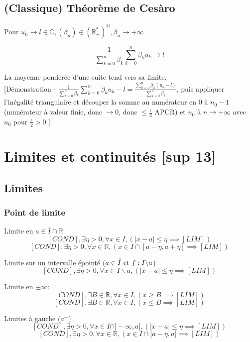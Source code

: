 \documentclass[openany]{book}
\begin{document}
\subsection{(Classique) Théorème de Cesàro}
Pour $ u_n \longrightarrow l \in \mathbb{C} , (\beta_n) \in (\mathbb{R}_+^*)^{\mathbb{N}} , \beta_n \longrightarrow +\infty $

\[ \frac{1}{\sum_{k=0}^{n} \beta_k} \sum_{k=0}^{n} \beta_k u_k \longrightarrow l \]

\noindent La moyenne pondérée d'une suite tend vers sa limite. \\

[Démonstration - $\frac{1}{\sum_{k=0}^{n} \beta_k} \sum_{k=0}^{n} \beta_k u_k - l = \frac{\sum_{k=0}^{n} \beta_k (u_k - l)}{\sum_{k=0}^{n} \beta_k}$, puis appliquer l'inégalité triangulaire et découper la somme au numérateur en $ 0 $ à $ n_0 - 1 $ (numérateur à valeur finie, donc $\longrightarrow 0$, donc $\leq \frac{\epsilon}{2}$ APCR) et $ n_0 $ à $ n \longrightarrow +\infty $ avec $n_0$ pour $\frac{\epsilon}{2} > 0$ ]

\clearpage

\section{Limites et continuités [sup 13]}
\subsection{Limites}
\subsubsection{Point de limite}
Limite en $a \in \overline{I}\cap\mathbb{R}$:
\[ [COND], \exists \eta > 0, \forall x \in I, (| x - a | \leq \eta \implies [LIM]) \]
\[ [COND], \exists \eta > 0, \forall x \in \mathbb{R}, (x \in I \cap [a-\eta, a+\eta] \implies [LIM]) \]

\noindent Limite sur un intervalle épointé ($a \in \mathring{I} \text{ et } f : I\backslash {a} $)
\[ [COND], \exists \eta > 0, \forall x \in I\backslash {a}, (| x - a | \leq \eta \implies [LIM]) \]

\noindent Limite en $\pm\infty$:
\[ [COND], \exists B \in \mathbb{R}, \forall x \in I, (x \geq B \implies [LIM]) \]
\[ [COND], \exists B \in \mathbb{R}, \forall x \in I, (x \leq B \implies [LIM]) \]

\noindent Limites à gauche ($a^-$) 
\[ [COND], \exists \eta > 0, \forall x \in I \cap ] - \infty, a [, (| x - a | \leq \eta \implies [LIM]) \]
\[ [COND], \exists \eta > 0, \forall x \in \mathbb{R}, (x \in I \cap [a-\eta, a[ \implies [LIM]) \]
\end{document}
